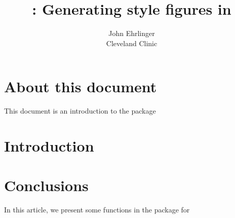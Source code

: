 \documentclass[nojss]{jss}\usepackage[]{graphicx}\usepackage[]{color}
\author{John Ehrlinger\\Cleveland Clinic} %
\title{{\pkg{ccfPlotting}}: Generating \code{plot.sas} style figures in \proglang{R}}
\begin{document}



\section{About this document}
This document is an introduction to the  package


\section{Introduction}


\section{Conclusions} \label{sec: concl}
In this article, we present some functions in the  package for  



\end{document}
